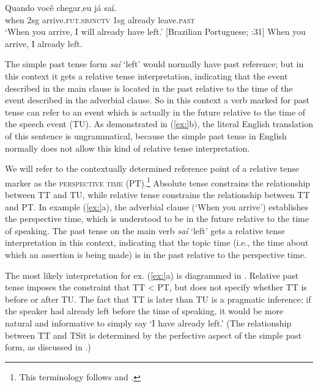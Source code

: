 \ea
\ea \gll Quando  você  chegar,\footnotemark  eu  já  saí.\\
when  2sg  arrive.\textsc{fut.sbjnctv}  1sg  already  leave.\textsc{past}\\
\glt ‘When you arrive, I will already have left.’   [Brazilian Portuguese; \citealt{Comrie1985}:31]
\ex   *When you arrive, I already left.
\z \z
{}


The simple past tense form \textit{saí} ‘left’ would normally have past reference; but in this context it gets a relative tense interpretation, indicating that the event described in the main clause is located in the past relative to the time of the event described in the adverbial clause. So in this context a verb marked for past tense can refer to an event which is actually in the future relative to the time of the speech event (TU). As demonstrated in (\ref{ex:}b), the literal English translation of this sentence is ungrammatical, because the simple past tense in English normally does not allow this kind of relative tense interpretation.



We will refer to the contextually determined reference point of a relative tense marker as the \textsc{perspective time} (PT).\footnote{This terminology follows \citet{Kiparsky2002} and \citet{Bohnemeyer2014}.} Absolute tense constrains the relationship between TT and TU, while relative tense constrains the relationship between TT and PT. In example (\ref{ex:}a), the adverbial clause (‘When you arrive’) establishes the perspective time, which is understood to be in the future relative to the time of speaking. The past tense on the main verb \textit{saí} ‘left’ gets a relative tense interpretation in this context, indicating that the topic time (i.e., the time about which an assertion is being made) is in the past relative to the perspective time.



The most likely interpretation for ex. (\ref{ex:}a) is diagrammed in . Relative past tense imposes the constraint that TT < PT, but does not specify whether TT is before or after TU. The fact that TT is later than TU is a pragmatic inference; if the speaker had already left before the time of speaking, it would be more natural and informative to simply say ‘I have already left.’ (The relationship between TT and TSit is determined by the perfective aspect of the simple past form, as discussed in .)


